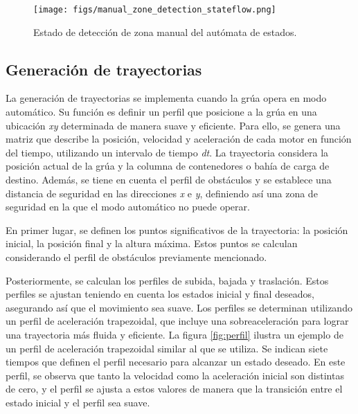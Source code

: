 \documentclass{article}
\begin{document}
            \begin{figure} [H]
                \centering
                \texttt{[image: figs/manual\_zone\_detection\_stateflow.png]}
                \caption{Estado de detección de zona manual del autómata de estados.}
                \label{fig:manual_zone_detection_stateflow}
            \end{figure}


    


        \subsection{Generación de trayectorias} \label{sec:gen_trayectorias}

            La generación de trayectorias se implementa cuando la grúa opera en modo automático. Su función es definir un perfil que posicione a la grúa en una ubicación \textit{xy} determinada de manera suave y eficiente. Para ello, se genera una matriz que describe la posición, velocidad y aceleración de cada motor en función del tiempo, utilizando un intervalo de tiempo \textit{dt}. La trayectoria considera la posición actual de la grúa y la columna de contenedores o bahía de carga de destino. Además, se tiene en cuenta el perfil de obstáculos y se establece una distancia de seguridad en las direcciones \textit{x} e \textit{y}, definiendo así una zona de seguridad en la que el modo automático no puede operar.

            En primer lugar, se definen los puntos significativos de la trayectoria: la posición inicial, la posición final y la altura máxima. Estos puntos se calculan considerando el perfil de obstáculos previamente mencionado.

            Posteriormente, se calculan los perfiles de subida, bajada y traslación. Estos perfiles se ajustan teniendo en cuenta los estados inicial y final deseados, asegurando así que el movimiento sea suave. Los perfiles se determinan utilizando un perfil de aceleración trapezoidal, que incluye una sobreaceleración para lograr una trayectoria más fluida y eficiente. La figura \ref{fig:perfil} ilustra un ejemplo de un perfil de aceleración trapezoidal similar al que se utiliza. Se indican siete tiempos que definen el perfil necesario para alcanzar un estado deseado. En este perfil, se observa que tanto la velocidad como la aceleración inicial son distintas de cero, y el perfil se ajusta a estos valores de manera que la transición entre el estado inicial y el perfil sea suave.
\end{document}
